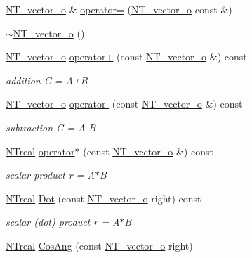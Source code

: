 \begin{DoxyCompactItemize}
\hyperlink{class_n_t__vector__o}{NT\_\-vector\_\-o} \& \hyperlink{class_n_t__vector__o_a1d802efe2a365a4652609740adceb690}{operator=} (\hyperlink{class_n_t__vector__o}{NT\_\-vector\_\-o} const \&)
\item 
\hyperlink{class_n_t__vector__o_a9e52f406166d7084a7a84ce581846f3f}{$\sim$NT\_\-vector\_\-o} ()
\item 
\hyperlink{class_n_t__vector__o}{NT\_\-vector\_\-o} \hyperlink{class_n_t__vector__o_a6a74004b224958ba4730829f39d0f0d2}{operator+} (const \hyperlink{class_n_t__vector__o}{NT\_\-vector\_\-o} \&) const 
\begin{DoxyCompactList}\small\item\em addition C = A+B \item\end{DoxyCompactList}\item 
\hyperlink{class_n_t__vector__o}{NT\_\-vector\_\-o} \hyperlink{class_n_t__vector__o_a50218c8299a11c754795964c020eb782}{operator-\/} (const \hyperlink{class_n_t__vector__o}{NT\_\-vector\_\-o} \&) const 
\begin{DoxyCompactList}\small\item\em subtraction C = A-\/B \item\end{DoxyCompactList}\item 
\hyperlink{nt__types_8h_a814a97893e9deb1eedcc7604529ba80d}{NTreal} \hyperlink{class_n_t__vector__o_a6cb212b1f483e22e9e6f7234056ac696}{operator$\ast$} (const \hyperlink{class_n_t__vector__o}{NT\_\-vector\_\-o} \&) const 
\begin{DoxyCompactList}\small\item\em scalar product r = A$\ast$B \item\end{DoxyCompactList}\item 
\hyperlink{nt__types_8h_a814a97893e9deb1eedcc7604529ba80d}{NTreal} \hyperlink{class_n_t__vector__o_a599c160cdd2c4f4580dfce88caf2dca6}{Dot} (const \hyperlink{class_n_t__vector__o}{NT\_\-vector\_\-o} right) const 
\begin{DoxyCompactList}\small\item\em scalar (dot) product r = A$\ast$B \item\end{DoxyCompactList}\item 
\hyperlink{nt__types_8h_a814a97893e9deb1eedcc7604529ba80d}{NTreal} \hyperlink{class_n_t__vector__o_a3950e9e2b13888af781cbd6ff0f3d62b}{CosAng} (const \hyperlink{class_n_t__vector__o}{NT\_\-vector\_\-o} right)

\end{DoxyCompactItemize}
